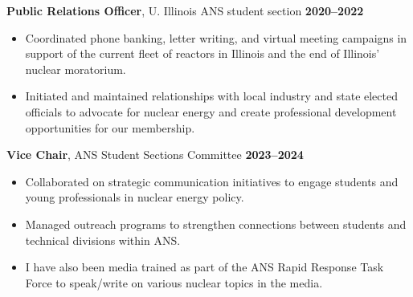 \documentclass[margin,line]{resume}
\begin{document}
\begin{resume}
    \textbf{Public Relations Officer}, U. Illinois ANS student section  \hfill \textbf{2020--2022}\vspace{.5mm}\\%
    \begin{itemize}
        \item Coordinated phone banking, letter writing, and virtual meeting campaigns in support of the current fleet of reactors in Illinois and the end of Illinois' nuclear moratorium.
        \item Initiated and maintained relationships with local industry and state elected officials to advocate for nuclear energy and create professional development opportunities for our membership.
    \end{itemize}

    \textbf{Vice Chair}, ANS Student Sections Committee  \hfill \textbf{2023--2024}\vspace{.5mm}\\%
    \begin{itemize}
        \item Collaborated on strategic communication initiatives to engage students and young professionals in nuclear energy policy.
        \item Managed outreach programs to strengthen connections between students and technical divisions within ANS.
        \item I have also been media trained as part of the ANS Rapid Response Task Force to speak/write on various nuclear topics in the media.
    \end{itemize}

\end{resume}
\end{document}
